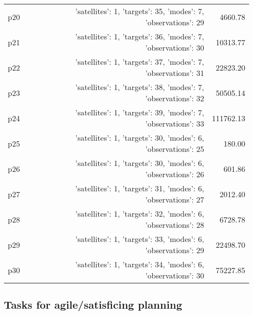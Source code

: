 \documentclass{article}
\begin{document}
\begin{center}
\begin{tabular}{@{}l|r|r@{}}
  p20&{'satellites': 1, 'targets': 35, 'modes': 7, 'observations': 29}&4660.78\\
  p21&{'satellites': 1, 'targets': 36, 'modes': 7, 'observations': 30}&10313.77\\
  p22&{'satellites': 1, 'targets': 37, 'modes': 7, 'observations': 31}&22823.20\\
  p23&{'satellites': 1, 'targets': 38, 'modes': 7, 'observations': 32}&50505.14\\
  p24&{'satellites': 1, 'targets': 39, 'modes': 7, 'observations': 33}&111762.13\\
  p25&{'satellites': 1, 'targets': 30, 'modes': 6, 'observations': 25}&180.00\\
  p26&{'satellites': 1, 'targets': 30, 'modes': 6, 'observations': 26}&601.86\\
  p27&{'satellites': 1, 'targets': 31, 'modes': 6, 'observations': 27}&2012.40\\
  p28&{'satellites': 1, 'targets': 32, 'modes': 6, 'observations': 28}&6728.78\\
  p29&{'satellites': 1, 'targets': 33, 'modes': 6, 'observations': 29}&22498.70\\
  p30&{'satellites': 1, 'targets': 34, 'modes': 6, 'observations': 30}&75227.85
                            \end{tabular}
                            \end{center}
                    

                                \subsection*{Tasks for agile/satisficing planning}
                                
\end{document}
